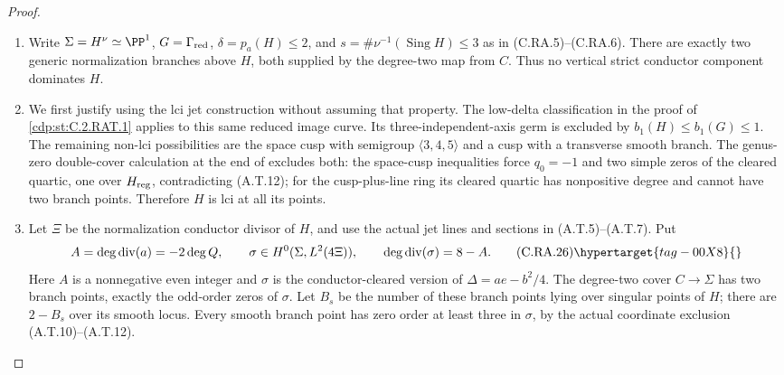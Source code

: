 \begin{proof}

\begin{enumerate}[label={$\langle1\rangle$\arabic*.},leftmargin=*]
\item Write $\Sigma=H^\nu\simeq\PP^1$, $G=\Gamma_{\rm red}$,
$\delta=p_a(H)\le2$, and
$s=\#\nu^{-1}(\operatorname{Sing}H)\le3$ as in
(C.RA.5)--(C.RA.6). There are exactly two generic
normalization branches above $H$, both supplied by the
degree-two map from $C$. Thus no vertical strict conductor
component dominates $H$.

\item We first justify using the lci jet construction without
assuming that property. The low-delta classification in the
proof of \ref{cdp:st:C.2.RAT.1} applies to this same reduced image curve.
Its three-independent-axis germ is excluded by
$b_1(H)\le b_1(G)\le1$. The remaining non-lci possibilities
are the space cusp with semigroup $\langle3,4,5\rangle$
and a cusp with a transverse smooth branch. The
genus-zero double-cover calculation at the end of 
excludes both: the space-cusp inequalities force
$q_0=-1$ and two simple zeros of the cleared quartic,
one over $H_{\rm reg}$, contradicting (A.T.12); for the
cusp-plus-line ring its cleared quartic has nonpositive
degree and cannot have two branch points. Therefore $H$
is lci at all its points.

\item Let $\Xi$ be the normalization conductor divisor of $H$,
and use the actual jet lines and sections in
(A.T.5)--(A.T.7). Put
\[
 A=\deg\operatorname{div}(a)=-2\deg Q,\qquad
 \sigma\in H^0(\Sigma,L^2(4\Xi)),\qquad
 \deg\operatorname{div}(\sigma)=8-A.
\tag{C.RA.26}\hypertarget{tag-00X8}{}\label{cdp:eq:C.RA.26}
\]
Here $A$ is a nonnegative even integer and $\sigma$ is
the conductor-cleared version of $\Delta=ae-b^2/4$.
The degree-two cover $C\to\Sigma$ has two branch points,
exactly the odd-order zeros of $\sigma$. Let $B_s$ be
the number of these branch points lying over singular
points of $H$; there are $2-B_s$ over its smooth locus.
Every smooth branch point has zero order at least three
in $\sigma$, by the actual coordinate exclusion
(A.T.10)--(A.T.12).


\end{enumerate}
\end{proof}
